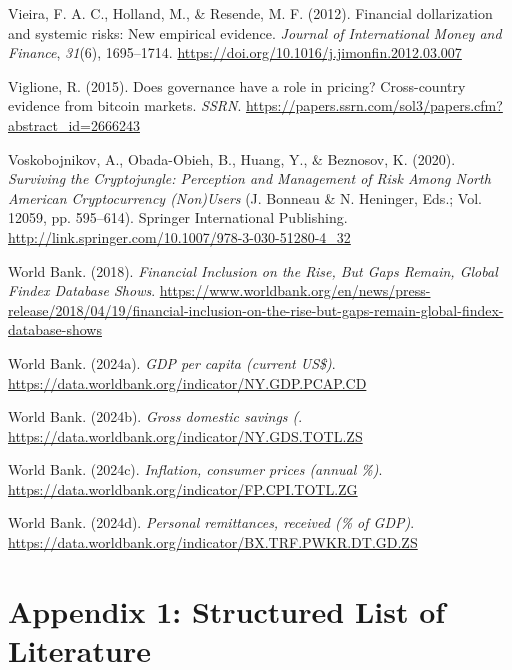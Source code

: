 \documentclass[
]{article}
\newlength{\cslhangindent}
\newenvironment{CSLReferences}[2] %
 {\begin{list}{}{%
  \setlength{\itemindent}{0pt}
  \setlength{\leftmargin}{0pt}
  \setlength{\parsep}{0pt}
  \ifodd #1
   \setlength{\leftmargin}{\cslhangindent}
   \setlength{\itemindent}{-1\cslhangindent}
  \fi
  \setlength{\itemsep}{#2\baselineskip}}}
 {\end{list}}
\begin{document}
\begin{CSLReferences}{1}{0}
Vieira, F. A. C., Holland, M., \& Resende, M. F. (2012). Financial dollarization and systemic risks: New empirical evidence. \emph{Journal of International Money and Finance}, \emph{31}(6), 1695--1714. \url{https://doi.org/10.1016/j.jimonfin.2012.03.007}

Viglione, R. (2015). Does governance have a role in pricing? Cross-country evidence from bitcoin markets. \emph{SSRN}. \url{https://papers.ssrn.com/sol3/papers.cfm?abstract_id=2666243}

Voskobojnikov, A., Obada-Obieh, B., Huang, Y., \& Beznosov, K. (2020). \emph{Surviving the Cryptojungle: Perception and Management of Risk Among North American Cryptocurrency (Non)Users} (J. Bonneau \& N. Heninger, Eds.; Vol. 12059, pp. 595--614). Springer International Publishing. \url{http://link.springer.com/10.1007/978-3-030-51280-4_32}

World Bank. (2018). \emph{Financial Inclusion on the Rise, But Gaps Remain, Global Findex Database Shows}. \url{https://www.worldbank.org/en/news/press-release/2018/04/19/financial-inclusion-on-the-rise-but-gaps-remain-global-findex-database-shows}

World Bank. (2024a). \emph{GDP per capita (current US{\$})}. \url{https://data.worldbank.org/indicator/NY.GDP.PCAP.CD}

World Bank. (2024b). \emph{Gross domestic savings (}. \url{https://data.worldbank.org/indicator/NY.GDS.TOTL.ZS}

World Bank. (2024c). \emph{Inflation, consumer prices (annual {\%})}. \url{https://data.worldbank.org/indicator/FP.CPI.TOTL.ZG}

World Bank. (2024d). \emph{Personal remittances, received ({\%} of GDP)}. \url{https://data.worldbank.org/indicator/BX.TRF.PWKR.DT.GD.ZS}

\end{CSLReferences}

\newpage

\section{Appendix 1: Structured List of Literature}\label{appendix-1-structured-list-of-literature}
\end{document}
